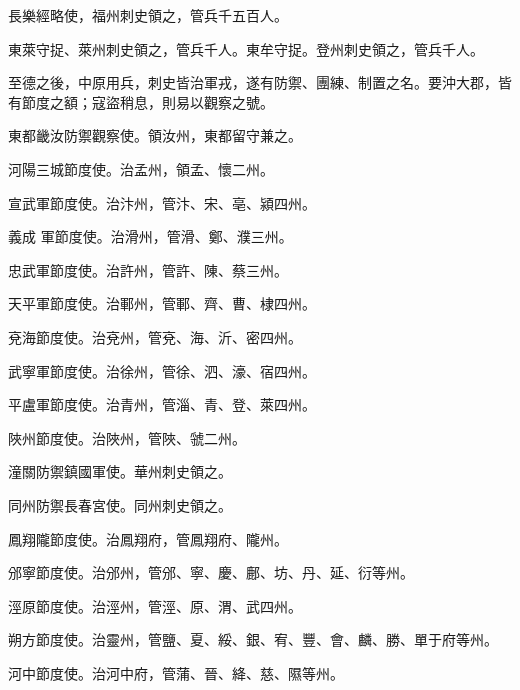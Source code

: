 \begin{pinyinscope}
 長樂經略使，福州刺史領之，管兵千五百人。



 東萊守捉、萊州刺史領之，管兵千人。東牟守捉。登州刺史領之，管兵千人。



 至德之後，中原用兵，刺史皆治軍戎，遂有防禦、團練、制置之名。要沖大郡，皆有節度之額；寇盜稍息，則易以觀察之號。



 東都畿汝防禦觀察使。領汝州，東都留守兼之。



 河陽三城節度使。治孟州，領孟、懷二州。



 宣武軍節度使。治汴州，管汴、宋、亳、潁四州。



 義成
 軍節度使。治滑州，管滑、鄭、濮三州。



 忠武軍節度使。治許州，管許、陳、蔡三州。



 天平軍節度使。治鄆州，管鄆、齊、曹、棣四州。



 兗海節度使。治兗州，管兗、海、沂、密四州。



 武寧軍節度使。治徐州，管徐、泗、濠、宿四州。



 平盧軍節度使。治青州，管淄、青、登、萊四州。



 陜州節度使。治陜州，管陜、虢二州。



 潼關防禦鎮國軍使。華州刺史領之。



 同州防禦長春宮使。同州刺史領之。



 鳳翔隴節度使。治鳳翔府，管鳳翔府、隴州。



 邠寧節度使。治邠州，管邠、寧、慶、鄜、坊、丹、延、衍等州。



 涇原節度使。治涇州，管涇、原、渭、武四州。



 朔方節度使。治靈州，管鹽、夏、綏、銀、宥、豐、會、麟、勝、單于府等州。



 河中節度使。治河中府，管蒲、晉、絳、慈、隰等州。




\end{pinyinscope}
